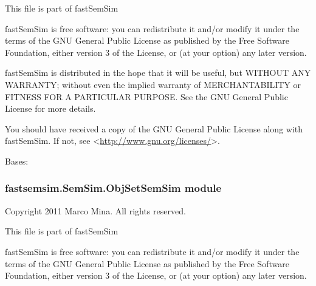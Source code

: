 \documentclass[letterpaper,10pt,english]{sphinxmanual}
\begin{document}
This file is part of fastSemSim

fastSemSim is free software: you can redistribute it and/or modify
it under the terms of the GNU General Public License as published by
the Free Software Foundation, either version 3 of the License, or
(at your option) any later version.

fastSemSim is distributed in the hope that it will be useful,
but WITHOUT ANY WARRANTY; without even the implied warranty of
MERCHANTABILITY or FITNESS FOR A PARTICULAR PURPOSE.  See the
GNU General Public License for more details.

You should have received a copy of the GNU General Public License
along with fastSemSim.  If not, see \textless{}\href{http://www.gnu.org/licenses/}{http://www.gnu.org/licenses/}\textgreater{}.

\begin{fulllineitems}
\label{fastsemsim.SemSim:fastsemsim.SemSim.ObjSemSim.ObjSemSim}
Bases: 

\begin{fulllineitems}
\label{fastsemsim.SemSim:fastsemsim.SemSim.ObjSemSim.ObjSemSim.SemSim}
\end{fulllineitems}


\end{fulllineitems}



\subsubsection{fastsemsim.SemSim.ObjSetSemSim module}
\label{fastsemsim.SemSim:module-fastsemsim.SemSim.ObjSetSemSim}\label{fastsemsim.SemSim:fastsemsim-semsim-objsetsemsim-module}
Copyright 2011 Marco Mina. All rights reserved.

This file is part of fastSemSim

fastSemSim is free software: you can redistribute it and/or modify
it under the terms of the GNU General Public License as published by
the Free Software Foundation, either version 3 of the License, or
(at your option) any later version.
\end{document}
